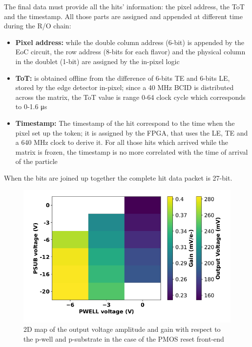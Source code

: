     The final data must provide all the hits' information: the pixel address, the ToT and the timestamp. All those parts are assigned and appended at different time during the R/O chain:  
    \begin{itemize}
        \item\textbf{Pixel address:} while the double column address (6-bit) is appended by the EoC circuit, the row address (8-bits for each flavor) and the physical column in the doublet (1-bit) are assigned by the in-pixel logic      
        \item \textbf{ToT:} is obtained offline from the difference of 6-bits TE and 6-bits LE, stored by the edge detector in-pixel; since a 40 MHz BCID is distributed across the matrix, the ToT value is range 0-64 clock cycle which corresponds to 0-1.6 \si{\us}  
        \item \textbf{Timestamp:} The timestamp of the hit correspond to the time when the pixel set up the token; it is assigned by the FPGA, that uses the LE, TE and a 640 MHz clock to derive it. For all those hits which arrived while the matrix is frozen, the timestamp is no more correlated with the time of arrival of the particle         
    \end{itemize}
    When the bits are joined up together the complete hit data packet is 27-bit. 


 
        \begin{figure}[h!]
            \centering
            \includegraphics[width=.40\linewidth]{figures/Monopix1/gain_vs_bias.png}
            \caption{2D map of the output voltage amplitude and gain with respect to the p-well and p-substrate in the case of the PMOS reset front-end }
            \label{fig:gain_vs_bias}
        \end{figure}      
    
    
    

